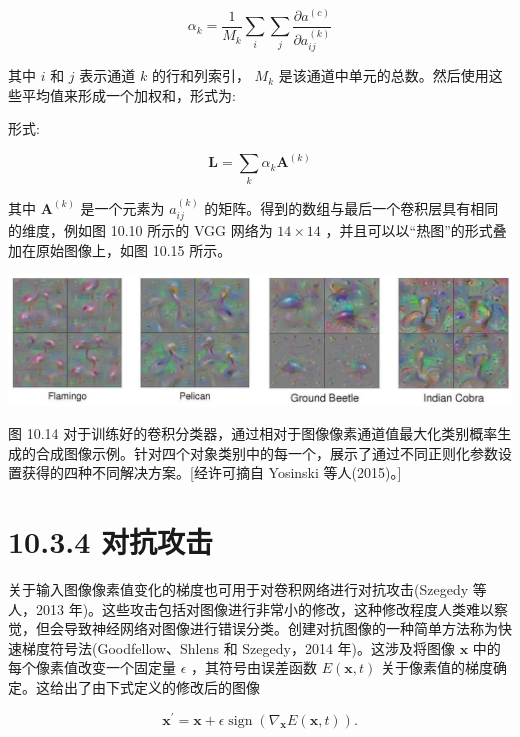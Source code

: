 \documentclass[10pt]{report}
\begin{document}
\[
{\alpha }_{k} = \frac{1}{{M}_{k}}\mathop{\sum }\limits_{i}\mathop{\sum }\limits_{j}\frac{\partial {a}^{\left( c\right) }}{\partial {a}_{ij}^{\left( k\right) }} \tag{10.9}
\]

其中 \(i\) 和 \(j\) 表示通道 \(k\) 的行和列索引， \({M}_{k}\) 是该通道中单元的总数。然后使用这些平均值来形成一个加权和，形式为:

形式:

\[
\mathbf{L} = \mathop{\sum }\limits_{k}{\alpha }_{k}{\mathbf{A}}^{\left( k\right) } \tag{10.10}
\]

其中 \({\mathbf{A}}^{\left( k\right) }\) 是一个元素为 \({a}_{ij}^{\left( k\right) }\) 的矩阵。得到的数组与最后一个卷积层具有相同的维度，例如图 10.10 所示的 VGG 网络为 \({14} \times  {14}\) ，并且可以以“热图”的形式叠加在原始图像上，如图 10.15 所示。

\begin{center}
\includegraphics[max width=1.0\textwidth]{images/0194e279-9b28-703a-88f4-c3ac21e2010d_325_226_407_1297_339_0.jpg}
\end{center}
\hspace*{3em} 

图 10.14 对于训练好的卷积分类器，通过相对于图像像素通道值最大化类别概率生成的合成图像示例。针对四个对象类别中的每一个，展示了通过不同正则化参数设置获得的四种不同解决方案。[经许可摘自 Yosinski 等人(2015)。]

\section*{10.3.4 对抗攻击}

关于输入图像像素值变化的梯度也可用于对卷积网络进行对抗攻击(Szegedy 等人，2013 年)。这些攻击包括对图像进行非常小的修改，这种修改程度人类难以察觉，但会导致神经网络对图像进行错误分类。创建对抗图像的一种简单方法称为快速梯度符号法(Goodfellow、Shlens 和 Szegedy，2014 年)。这涉及将图像 \(\mathbf{x}\) 中的每个像素值改变一个固定量 \(\epsilon\) ，其符号由误差函数 \(E\left( {\mathbf{x},t}\right)\) 关于像素值的梯度确定。这给出了由下式定义的修改后的图像

\[
{\mathbf{x}}^{\prime } = \mathbf{x} + \epsilon \operatorname{sign}\left( {{\nabla }_{\mathbf{x}}E\left( {\mathbf{x},t}\right) }\right) . \tag{10.11}
\]
\end{document}
